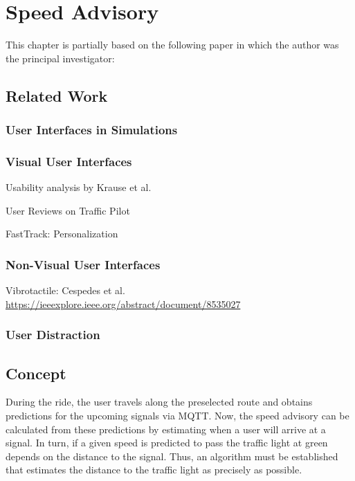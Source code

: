 \chapter{Speed Advisory}\label{ch:app}

\begin{Summary}
This chapter is partially based on the following paper in which the author was the principal investigator:

\cite{matthes2022selecting} 
\end{Summary}

\section{Related Work}\label{sec:rw-uis}

\subsection{User Interfaces in Simulations}

\subsection{Visual User Interfaces}

Usability analysis by Krause et al.

User Reviews on Traffic Pilot

FastTrack: Personalization

\subsection{Non-Visual User Interfaces}

Vibrotactile: Cespedes et al. \url{https://ieeexplore.ieee.org/abstract/document/8535027}

\subsection{User Distraction}

\section{Concept}

During the ride, the user travels along the preselected route and obtains predictions for the upcoming signals via MQTT. Now, the speed advisory can be calculated from these predictions by estimating when a user will arrive at a signal. In turn, if a given speed is predicted to pass the traffic light at green depends on the distance to the signal. Thus, an algorithm must be established that estimates the distance to the traffic light as precisely as possible.

